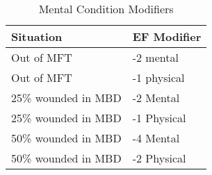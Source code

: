 
\begin{table}[hb]
\caption{Mental Condition Modifiers}
\centering
	\begin{tabular}{||l|l||} \hline
	Situation			& EF Modifier	\\ \hline
	Out of MFT 			& -2 mental 	\\
	Out of MFT			& -1 physical	\\
	25\% wounded in MBD & -2 Mental		\\
	25\% wounded in MBD	& -1 Physical 	\\
	50\% wounded in MBD & -4 Mental		\\
	50\% wounded in MBD & -2 Physical	\\ \hline
	\end{tabular}
\end{table}

